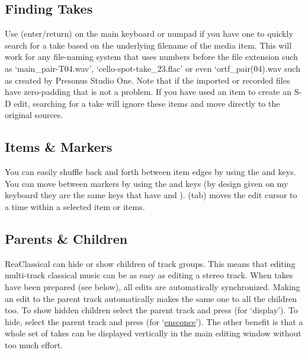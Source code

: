 \documentclass[10pt,american]{article}
\begin{document}
\subsection{Finding Takes}

Use \keys{\return} (enter/return) on the main keyboard or numpad if you have one
to quickly search for a take based on the underlying filename of the media item.
This will work for any file-naming system that uses numbers before the file
extension such as `main\_pair-T04.wav', `cello-spot-take\_23.flac' or even
`ortf\_pair(04).wav such as created by Presonus Studio One. Note that if the
imported or recorded files have zero-padding that is not a problem. If you have
used an item to create an S-D edit, searching for a take will ignore these items
and move directly to the original sources.

\subsection{Items \& Markers}

You can easily shuffle back and forth between item edges by using the 
and  keys. You can move between markers by using the \keys{,} and
 keys (by design given on my keyboard they are the same keys that have
\keys{<} and \keys{>}). \keys{\tab} (tab) moves the edit cursor to a time within
a selected item or items. 

\subsection{Parents \& Children}

ReaClassical can hide or show children of track groups. This means that editing
multi-track classical music can be as easy as editing a stereo track. When takes
have been prepared (see below), all edits are automatically synchronized. Making
an edit to the parent track automatically makes the same one to all the children
too. To show hidden children select the parent track and press  (for
`display'). To hide, select the parent track and press  (for
`\href{https://www.merriam-webster.com/dictionary/ensconce}{ensconce}'). The
other benefit is that a whole set of takes can be displayed vertically in the
main editing window without too much effort. 
\end{document}
